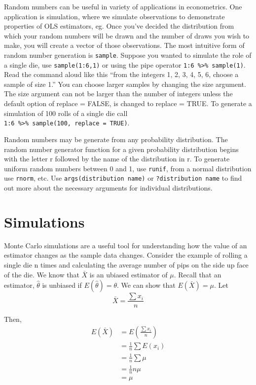 \documentclass[]{book}
\begin{document}
Random numbers can be useful in variety of applications in econometrics. One application is simulation, where we simulate observations to demonstrate properties of OLS estimators, eg. Once you've decided the distribution from which your random numbers will be drawn and the number of draws you wish to make, you will create a vector of those observations. The most intuitive form of random number generation is \texttt{sample}. Suppose you wanted to simulate the role of a single die, use \texttt{sample(1:6,1)} or using the pipe operator \texttt{1:6\ \%\textgreater{}\%\ sample(1)}. Read the command aloud like this ``from the integers 1, 2, 3, 4, 5, 6, choose a sample of size 1.'' You can choose larger samples by changing the size argument. The size argument can not be larger than the number of integers unless the default option of replace = FALSE, is changed to replace = TRUE. To generate a simulation of 100 rolls of a single die call \texttt{1:6\ \%\textgreater{}\%\ sample(100,\ replace\ =\ TRUE)}.

Random numbers may be generate from any probability distribution. The random number generator function for a given probability distribution begins with the letter r followed by the name of the distribution in r. To generate uniform random numbers between 0 and 1, use \texttt{runif}, from a normal distribution use \texttt{rnorm}, etc. Use \texttt{args(distribution\ name)} or \texttt{?distribution\ name} to find out more about the necessary arguments for individual distributions.

\hypertarget{simulations}{%
\section{Simulations}\label{simulations}}

Monte Carlo simulations are a useful tool for understanding how the value of an estimator changes as the sample data changes. Consider the example of rolling a single die n times and calculating the average number of pips on the side up face of the die. We know that \(\bar X\) is an ubiased estimator of \(\mu\). Recall that an estimator, \(\hat\theta\) is unbiased if \(E(\hat\theta) = \theta\). We can show that \(E(\bar X) = \mu\). Let \[\bar X = \frac{\sum{x_i}}{n}\]

Then, \[\begin{aligned}
E(\bar{X}) &= E\left( \frac{\sum{x_i}}{n} \right)\\
&= \frac{1}{n}\sum{E(x_i)} \\
&= \frac{1}{n}\sum{\mu}\\
&= \frac{1}{n}n\mu\\
&= \mu
\end{aligned}\]
\end{document}
